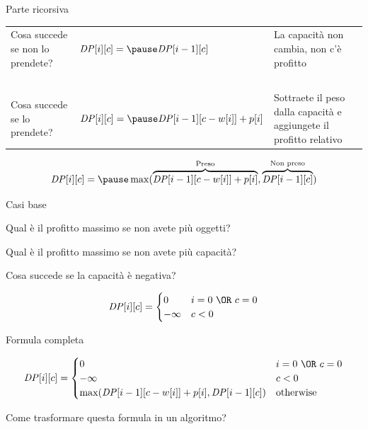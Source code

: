 \begin{frame}{Parte ricorsiva}

\vspace{-9pt}

\bigskip
\begingroup
\renewcommand*{\arraystretch}{1.2}
\begin{tabular}{P{2.8cm}P{3.9cm}P{4.0cm}}
Cosa succede se non lo prendete? & $\mathit{DP}[i][c] = \pause\newline \mathit{DP}[i-1][c]$ & La capacità non cambia, non c'è profitto \\
~\\
Cosa succede se lo prendete? & $\mathit{DP}[i][c] = \pause \mathit{DP}[i-1][c-w[i]] + p[i]$ & Sottraete il peso dalla capacità e aggiungete il profitto relativo \\
\end{tabular}
\endgroup


\[
\mathit{DP}[i][c] = \pause \max( \overbrace{\mathit{DP}[i-1][c-w[i]]+p[i]}^{\textrm{Preso}},\overbrace{\mathit{DP}[i-1][c]}^{\textrm{Non preso}} )
\]

\end{frame}


\begin{frame}{Casi base}

\vspace{-9pt}

\pause
\BIL
\item Qual è il profitto massimo se non avete più oggetti?
\item Qual è il profitto massimo se non avete più capacità?
\item Cosa succede se la capacità è negativa?
\EIL

\pause
\[
\mathit{DP}[i][c] = \begin{cases}
  0 & i=0\ \OR\ c=0 \\
  -\infty & c < 0
\end{cases}
\]

\end{frame}

\begin{frame}{Formula completa}

\begingroup
\small
\[
\mathit{DP}[i][c] = \begin{cases}
  0 & i=0\ \OR\ c=0 \\
  -\infty & c < 0 \\
  \max( \mathit{DP}[i-1][c-w[i]] + p[i], \mathit{DP}[i-1][c] ) & \textrm{otherwise}
\end{cases}
\]
\endgroup

Come trasformare questa formula in un algoritmo?

\end{frame}

